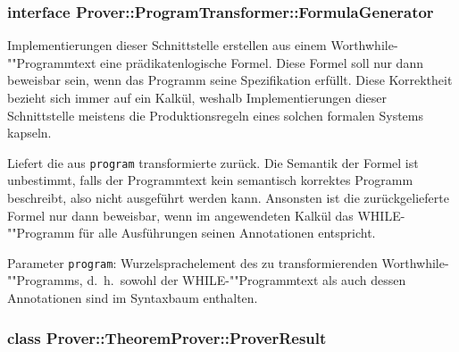 \subsubsection{interface Prover::ProgramTransformer::FormulaGenerator}%

Implementierungen dieser Schnittstelle erstellen aus einem
Worthwhile-""Programmtext eine prädikatenlogische Formel. Diese Formel
soll nur dann beweisbar sein, wenn das Programm seine Spezifikation
erfüllt. Diese Korrektheit bezieht sich immer auf ein Kalkül, weshalb
Implementierungen dieser Schnittstelle meistens die Produktionsregeln
eines solchen formalen Systems kapseln.%

\begin{description}%

    Liefert die aus \texttt{program} transformierte 
    zurück. Die Semantik der Formel ist unbestimmt, falls der
    Programmtext kein semantisch korrektes Programm beschreibt, also
    nicht ausgeführt werden kann. Ansonsten ist die zurückgelieferte
    Formel nur dann beweisbar, wenn im angewendeten Kalkül das
    WHILE-""Programm für alle Ausführungen seinen Annotationen
    entspricht.%

    Parameter \texttt{program}: Wurzelsprachelement des zu
    transformierenden Worthwhile-""Programms, d.~h.\ sowohl der
    WHILE-""Programmtext als auch dessen Annotationen sind im
    Syntaxbaum enthalten.%

\end{description}%

\subsubsection{class Prover::TheoremProver::ProverResult}%


\begin{description}%


\end{description}%


\begin{description}%

\end{description}%

